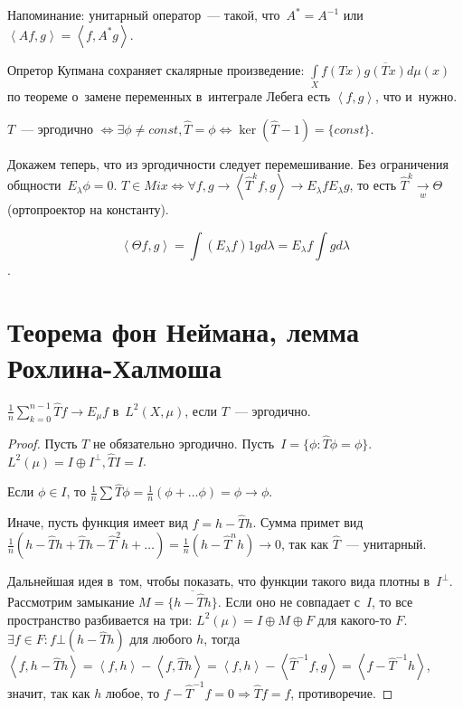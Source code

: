 \documentclass{article}
\begin{document}
Напоминание: унитарный оператор~--- такой, что~$A^\ast = A^{-1}$ или $\left< Af,
g \right> = \left<f, A^\ast g\right>$.

Опретор Купмана сохраняет скалярные произведение:
$\int\limits_X f(Tx) \overline{g(Tx)} d\mu(x)$ по теореме о~замене переменных
в~интеграле Лебега есть $\left<f, g\right>$, что и~нужно.

\begin{exercise}
	$T$~--- эргодично $\Leftrightarrow \exists \phi \ne const, \hat T = \phi
	\Leftrightarrow \ker(\hat T - 1) = \{const\}$.
\end{exercise}

Докажем теперь, что из эргодичности следует перемешивание. Без ограничения
общности~$E_\lambda \phi = 0$. $T \in Mix \Leftrightarrow \forall f, g
\rightarrow \left<\hat T^k f, g\right> \rightarrow E_\lambda f E_\lambda g$, то
есть $\hat T^k \underset{w}\rightarrow \Theta$ (ортопроектор на константу).

$$\left< \Theta f, g \right> = \int (E_\lambda f) 1 g d\lambda =
E_\lambda f \int g d\lambda$$.

\section{Теорема фон Неймана, лемма Рохлина-Халмоша}

\begin{theorem}
	$\frac{1}{n} \sum\limits_{k=0}^{n-1} \hat T f \rightarrow E_\mu f$ в~$L^2(X,
	\mu)$, если $T$~--- эргодично.
\end{theorem}
\begin{proof}
	Пусть $T$ не обязательно эргодично. Пусть~$I = \{ \phi:
	\hat T \phi = \phi \}$. $L^2(\mu) = I \oplus I^\bot, \hat TI = I$.

	Если $\phi \in I$, то $\frac{1}{n} \sum \hat T \phi = \frac{1}{n} (\phi +
	\ldots \phi) = \phi \rightarrow \phi$.

	Иначе, пусть функция имеет вид $f = h - \hat T h$. Сумма примет
	вид~$\frac{1}{n}\left(h - \hat Th + \hat Th - \hat T^2h + \ldots \right) =
	\frac{1}{n}(h - \hat T^n h) \rightarrow 0$, так как $\hat T$~--- унитарный.

	Дальнейшая идея в~том, чтобы показать, что функции такого вида плотны
	в~$I^\bot$. Рассмотрим замыкание $M = \overline{\{h - \hat T h\}}$.
	Если оно не совпадает с~$I$, то все пространство разбивается на три: $L^2(\mu)
	= I \oplus M \oplus F$ для какого-то $F$. $\exists f \in F: f \bot (h - \hat T
	h)$ для любого $h$, тогда $\left<f, h - \hat Th\right> = \left<f, h\right> -
	\left<f, \hat Th\right> = \left<f, h\right> - \left<\hat T^{-1}f, g\right> =
	\left<f - \hat T^{-1}h\right>$, значит, так как $h$ любое, то $f -
	\hat T^{-1}f = 0 \Rightarrow \hat T f = f$, противоречие.
\end{proof}
\end{document}
